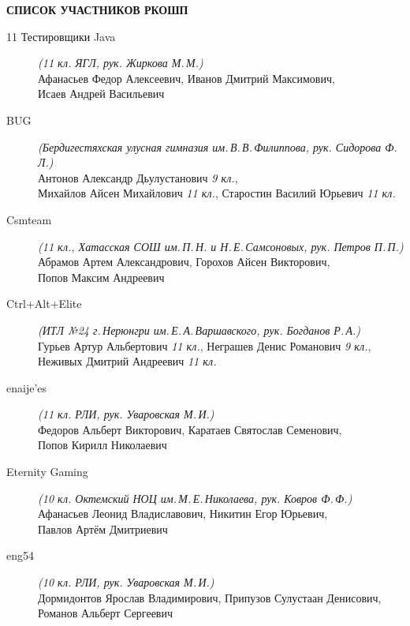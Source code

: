 \newpage
\noindent
\textbf{СПИСОК УЧАСТНИКОВ РКОШП}
\begin{description}

\item[11 Тестировщики Java] \textit{(11 кл. ЯГЛ, рук. Жиркова М.\,М.)} \\
Афанасьев Федор Алексеевич, Иванов Дмитрий Максимович, \\
Исаев Андрей Васильевич

\item[BUG] \textit{(Бердигестяхская улусная гимназия им.\,В.\,В.\,Филиппова, рук. Сидорова Ф.\,Л.)} \\
Антонов Александр Дьулустанович \textit{9 кл.}, \\
Михайлов Айсен Михайлович \textit{11 кл.}, Старостин Василий Юрьевич \textit{11 кл.}

\item[Csmteam] \textit{(11 кл., Хатасская СОШ им.\,П.\,Н. и Н.\,Е.\,Самсоновых, рук. Петров П.\,П.)} \\
Абрамов Артем Александрович, Горохов Айсен Викторович, \\
Попов Максим Андреевич

\item[Ctrl+Alt+Elite] \textit{(ИТЛ №24 г.\,Нерюнгри им.\,Е.\,А.\,Варшавского, рук. Богданов Р.\,А.)} \\
Гурьев Артур Альбертович \textit{11 кл.}, Неграшев Денис Романович \textit{9 кл.}, \\
Неживых Дмитрий Андреевич \textit{11 кл.}

\item[enaije'es] \textit{(11 кл. РЛИ, рук. Уваровская М.\,И.)} \\
Федоров Альберт Викторович, Каратаев Святослав Семенович, \\
Попов Кирилл Николаевич

\item[Eternity Gaming] \textit{(10 кл. Октемский НОЦ им.\,М.\,Е.\,Николаева, рук. Ковров Ф.\,Ф.)} \\
Афанасьев Леонид Владиславович, Никитин Егор Юрьевич, \\
Павлов Артём Дмитриевич

\item[eng54] \textit{(10 кл. РЛИ, рук. Уваровская М.\,И.)} \\
Дормидонтов Ярослав Владимирович, Припузов Сулустаан Денисович, \\
Романов Альберт Сергеевич


\end{description}
